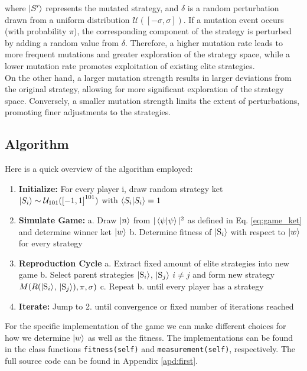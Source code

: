where $\ket{S'}$ represents the mutated strategy, and $\delta$ is a random perturbation drawn from a uniform distribution $\mathcal{U}(\left[-\sigma, \sigma\right])$. If a mutation event occurs (with probability $\pi$), the corresponding component of the strategy is perturbed by adding a random value from $\delta$. Therefore, a higher mutation rate leads to more frequent mutations and greater exploration of the strategy space, while a lower mutation rate promotes exploitation of existing elite strategies.\\

On the other hand, a larger mutation strength results in larger deviations from the original strategy, allowing for more significant exploration of the strategy space. Conversely, a smaller mutation strength limits the extent of perturbations, promoting finer adjustments to the strategies.\\

\subsection{Algorithm}

Here is a quick overview of the algorithm employed:
\begin{enumerate}
    \item \textbf{Initialize:} For every player i, draw random strategy ket $\ket{S_i} \sim \mathcal{U}_{101}(\left[-1, 1\right]^{101})$ with $\braket{S_i|S_i}=1$    
    \item \textbf{Simulate Game:} 
    \subitem \hspace{-0.7cm}a. Draw $\ket{n}$ from $|\braket{\psi|\psi}|^2$ as defined in Eq. \ref{eq:game_ket} and determine winner ket $\ket{w}$
    \subitem \hspace{-0.7cm}b. Determine fitness of $\ket{\text{S}_i}$ with respect to $\ket{w}$ for every strategy
    \item \textbf{Reproduction Cycle}
    \subitem \hspace{-0.7cm}a. Extract fixed amount of elite strategies into new game
    \subitem \hspace{-0.7cm}b. Select parent strategies $\ket{\text{S}_i}$, $\ket{\text{S}_j}$  $i \neq j$ and form new strategy $M(R(\ket{\text{S}_i}$, $\ket{\text{S}_j}), \pi, \sigma)$
    \subitem \hspace{-0.7cm}c. Repeat b. until every player has a strategy
    \item \textbf{Iterate:} Jump to 2. until convergence or fixed number of iterations reached
\end{enumerate}

For the specific implementation of the game we can make different choices for how we determine $\ket{w}$ as well as the fitness. The implementations can be found in the class functions \texttt{fitness(self)} and \texttt{measurement(self)}, respectively. The full source code can be found in Appendix \ref{apd:first}.\\






